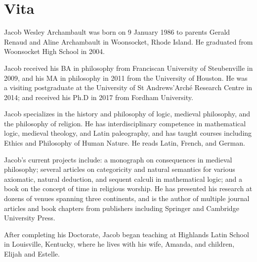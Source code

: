 \chapter{Vita}
Jacob Wesley Archambault was born on 9 January 1986 to parents Gerald Renaud and Aline Archambault in Woonsocket, Rhode Island. He graduated from Woonsocket High School in 2004. 

Jacob received his BA in philosophy from Franciscan University of Steubenville in 2009, and his MA in philosophy in 2011 from the University of Houston. He was a visiting postgraduate at the University of St Andrews'Arch\'{e} Research Centre in 2014; and received his Ph.D in 2017 from Fordham University. 

Jacob specializes in the history and philosophy of logic, medieval philosophy, and the philosophy of religion. He has interdisciplinary competence in mathematical logic, medieval theology, and Latin paleography, and has taught courses including Ethics and Philosophy of Human Nature. He reads Latin, French, and German.

Jacob's current projects include: a monograph on consequences in medieval philosophy; several articles on categoricity and natural semantics for various axiomatic, natural deduction, and sequent calculi in mathematical logic; and a book on the concept of time in religious worship. He has presented his research at dozens of venues spanning three continents, and is the author of multiple journal articles and book chapters from publishers including Springer and  Cambridge University Press.

After completing his Doctorate, Jacob began teaching at Highlands Latin School in Louisville, Kentucky, where he lives with his wife, Amanda, and children, Elijah and Estelle.